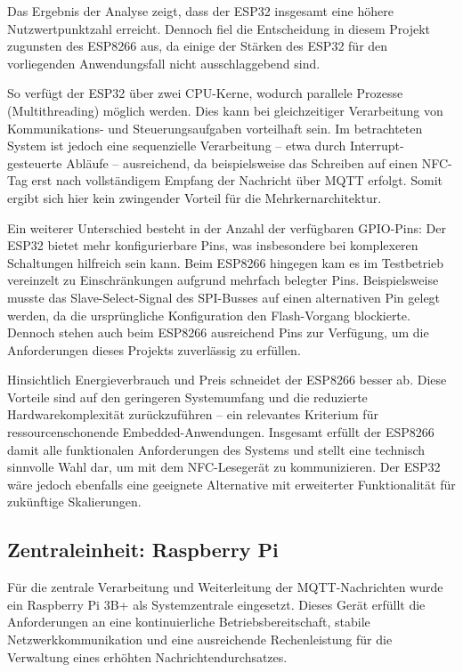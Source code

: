 Das Ergebnis der Analyse zeigt, dass der ESP32 insgesamt eine höhere Nutzwertpunktzahl erreicht. Dennoch fiel die Entscheidung in diesem Projekt zugunsten des ESP8266 aus, da einige der Stärken des ESP32 für den vorliegenden Anwendungsfall nicht ausschlaggebend sind.

So verfügt der ESP32 über zwei CPU-Kerne, wodurch parallele Prozesse (Multithreading) möglich werden. Dies kann bei gleichzeitiger Verarbeitung von Kommunikations- und Steuerungsaufgaben vorteilhaft sein. Im betrachteten System ist jedoch eine sequenzielle Verarbeitung – etwa durch Interrupt-gesteuerte Abläufe – ausreichend, da beispielsweise das Schreiben auf einen NFC-Tag erst nach vollständigem Empfang der Nachricht über MQTT erfolgt. Somit ergibt sich hier kein zwingender Vorteil für die Mehrkernarchitektur.

Ein weiterer Unterschied besteht in der Anzahl der verfügbaren GPIO-Pins: Der ESP32 bietet mehr konfigurierbare Pins, was insbesondere bei komplexeren Schaltungen hilfreich sein kann. Beim ESP8266 hingegen kam es im Testbetrieb vereinzelt zu Einschränkungen aufgrund mehrfach belegter Pins. Beispielsweise musste das Slave-Select-Signal des SPI-Busses auf einen alternativen Pin gelegt werden, da die ursprüngliche Konfiguration den Flash-Vorgang blockierte. Dennoch stehen auch beim ESP8266 ausreichend Pins zur Verfügung, um die Anforderungen dieses Projekts zuverlässig zu erfüllen.

Hinsichtlich Energieverbrauch und Preis schneidet der ESP8266 besser ab. Diese Vorteile sind auf den geringeren Systemumfang und die reduzierte Hardwarekomplexität zurückzuführen – ein relevantes Kriterium für ressourcenschonende Embedded-Anwendungen. Insgesamt erfüllt der ESP8266 damit alle funktionalen Anforderungen des Systems und stellt eine technisch sinnvolle Wahl dar, um mit dem NFC-Lesegerät zu kommunizieren. Der ESP32 wäre jedoch ebenfalls eine geeignete Alternative mit erweiterter Funktionalität für zukünftige Skalierungen.

\subsection{Zentraleinheit: Raspberry Pi}


Für die zentrale Verarbeitung und Weiterleitung der MQTT-Nachrichten wurde ein Raspberry Pi 3B+ als Systemzentrale eingesetzt. Dieses Gerät erfüllt die Anforderungen an eine kontinuierliche Betriebsbereitschaft, stabile Netzwerkkommunikation und eine ausreichende Rechenleistung für die Verwaltung eines erhöhten Nachrichtendurchsatzes. 

